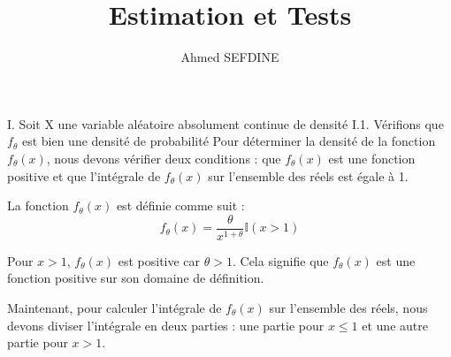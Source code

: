 \documentclass[11pt]{beamer}
\begin{document}
	\author{Ahmed SEFDINE}

	\title{Estimation et Tests}
	\begin{frame}[plain]
		\maketitle
	\end{frame}
	
	\begin{frame}{I. Soit X une variable aléatoire absolument continue de densité}
		{I.1. Vérifions que $f_\theta$ est bien une densité de probabilité  }
		Pour déterminer la densité de la fonction $f_\theta(x)$, nous devons vérifier deux conditions : que $f_\theta(x)$ est une fonction positive et que l'intégrale de $f_\theta(x)$ sur l'ensemble des réels est égale à 1.
		
		La fonction $f_\theta(x)$ est définie comme suit :
		\[ f_\theta(x) = \frac{\theta}{x^{1+\theta}} \mathbb{I}(x > 1) \]
		
		Pour $x > 1$, $f_\theta(x)$ est positive car $\theta > 1$. Cela signifie que $f_\theta(x)$ est une fonction positive sur son domaine de définition.
		
		Maintenant, pour calculer l'intégrale de $f_\theta(x)$ sur l'ensemble des réels, nous devons diviser l'intégrale en deux parties : une partie pour $x \leq 1$ et une autre partie pour $x > 1$.
		
	\end{frame}
	
\end{document}
